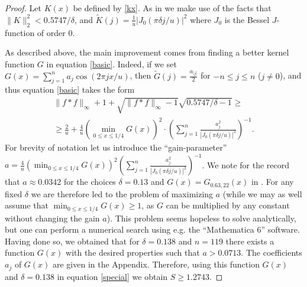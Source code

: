 \documentclass[12pt]{amsart}
\theoremstyle{definition}
\begin{document}
\begin{proof}

Let $K(x)$ be defined by \eqref{kx}. As in \cite{martin} we make
use of the facts that $\|K\|_2^2< 0.5747/\delta$, and $\tilde
K(j)=\frac{1}{u}|J_0(\pi \delta j/u)|^2$ where $J_0$ is the Bessel
$J$-function of order 0.

\medskip

As described above, the main improvement comes from finding a
better kernel function $G$ in equation \eqref{basic}. Indeed, if
we set $G(x)=\sum_{j=1}^n a_j \cos (2\pi j x/u)$, then $\tilde
G(j)=\frac{a_{|j|}}{2}$ for $-n\le j \le n$ ($j\ne 0$), and thus
equation \eqref{basic} takes the form
\begin{eqnarray}\label{special}
\|f\ast f\|_\infty + 1 + \sqrt{\|f\ast f\|_\infty - 1} \sqrt{0.5747/\delta-1} \ge \\
\ge \frac{2}{u}+\frac{4}{u}\left (\min_{0\le x\le 1/4} G(x) \right )^2
\cdot \left ( \sum_{j=1}^{n} \frac{a_j^2}{|J_0(\pi \delta j/u)|^2} \right )^{-1}. \nonumber
\end{eqnarray}
For brevity of notation let us introduce the ``gain-parameter''
$a=\frac{4}{u}\left (\min_{0\le x\le 1/4} G(x) \right )^2\left (
 \sum_{j=1}^{n} \frac{a_j^2}{|J_0(\pi \delta
j/u)|^2} \right )^{-1}$. We note for the record that $a\approx
0.0342$ for the choices $\delta=0.13$ and $G(x)=G_{0.63,22}(x)$ in
\cite{martin}. For any fixed $\delta$ we are therefore led to the
problem of maximizing $a$ (while we may as well assume that
$\min_{0\le x\le 1/4} G(x)\ge 1$, as $G$ can be multiplied by any
constant without changing the gain $a$). This problem seems
hopeless to solve analytically, but one can perform a numerical
search using e.g. the ``Mathematica 6'' software. Having done so, we
obtained that for $\delta=0.138$ and $n=119$ there exists a
function $G(x)$ with the desired properties such that $a>0.0713$.
The coefficients $a_j$ of $G(x)$ are given in the Appendix.
Therefore, using this function $G(x)$ and $\delta=0.138$ in
equation \eqref{special} we obtain $S\ge 1.2743.$

\bigskip


\end{proof}
\end{document}
